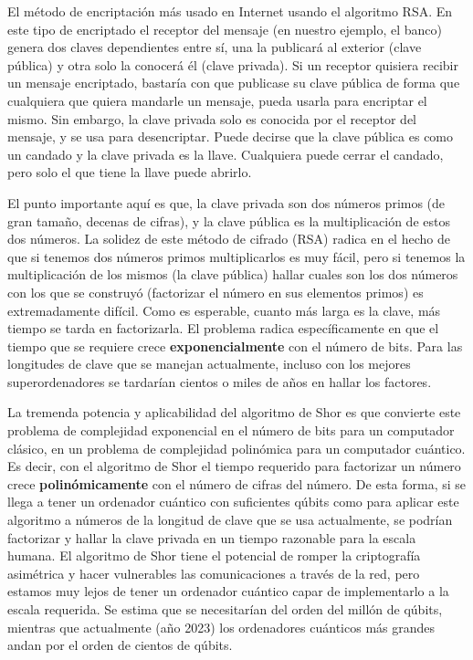 \documentclass[a4paper,11pt]{book} %
\numberwithin{equation}{chapter}
\begin{document}
El método de encriptación más usado en Internet usando el algoritmo RSA. En este tipo de encriptado el receptor del mensaje (en nuestro ejemplo, el banco) genera dos claves dependientes entre sí, una la publicará al exterior (clave pública) y otra solo la conocerá él (clave privada). Si un receptor quisiera recibir un mensaje encriptado, bastaría con que publicase su clave pública de forma que cualquiera que quiera mandarle un mensaje, pueda usarla para encriptar el mismo. Sin embargo, la clave privada solo es conocida por el receptor del mensaje, y se usa para desencriptar. Puede decirse que la clave pública es como un candado y la clave privada es la llave. Cualquiera puede cerrar el candado, pero solo el que tiene la llave puede abrirlo. 

El punto importante aquí es que, la clave privada son dos números primos (de gran tamaño, decenas de cifras), y la clave pública es la multiplicación de estos dos números. La solidez de este método de cifrado (RSA) radica en el hecho de que si tenemos dos números primos multiplicarlos es muy fácil, pero si tenemos la multiplicación de los mismos (la clave pública) hallar cuales son los dos números con los que se construyó (factorizar el número en sus elementos primos) es extremadamente difícil. Como es esperable, cuanto más larga es la clave, más tiempo se tarda en factorizarla. El problema radica específicamente en que el tiempo que se requiere crece \textbf{exponencialmente} con el número de bits. Para las longitudes de clave que se manejan actualmente, incluso con los mejores superordenadores se tardarían cientos o miles de años en hallar los factores.

La tremenda potencia y aplicabilidad del algoritmo de Shor es que convierte este problema de complejidad exponencial en el número de bits para un computador clásico, en un problema de complejidad polinómica para un computador cuántico. Es decir, con el algoritmo de Shor el tiempo requerido para factorizar un número crece \textbf{polinómicamente} con el número de cifras del número. De esta forma, si se llega a tener un ordenador cuántico con suficientes qúbits como para aplicar este algoritmo a números de la longitud de clave que se usa actualmente, se podrían factorizar y hallar la clave privada en un tiempo razonable para la escala humana. El algoritmo de Shor tiene el potencial de romper la criptografía asimétrica y hacer vulnerables las comunicaciones a través de la red, pero estamos muy lejos de tener un ordenador cuántico capar de implementarlo a la escala requerida. Se estima que se necesitarían del orden del millón de qúbits, mientras que actualmente (año 2023) los ordenadores cuánticos más grandes andan por el orden de cientos de qúbits.
\end{document}
